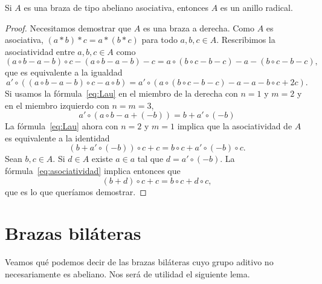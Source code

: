 


\begin{theorem}
    \label{thm:Lau}
	Si $A$ es una braza de tipo abeliano asociativa, entonces $A$ es un anillo radical. 	
\end{theorem}

\begin{proof}
    Necesitamos demostrar que $A$ es una braza a derecha. 
	Como $A$ es asociativa, $(a*b)*c=a*(b*c)$ para todo $a,b,c\in A$. Rescribimos la asociatividad entre $a,b,c\in A$ como
	\[
	(a\circ b-a-b)\circ c-(a\circ b-a-b)-c
	=a\circ (b\circ c-b-c)-a-(b\circ c-b-c),
	\]
	que es equivalente a la igualdad 
	\[
	a'\circ ( (a\circ b-a-b)\circ c-a\circ b)
	=a'\circ ( a\circ (b\circ c-b-c)-a-a-b\circ c+2c).
	\]
	Si usamos la fórmula~\eqref{eq:Lau} en el miembro 
	de la derecha con $n=1$ y $m=2$ y en el miembro izquierdo
	con $n=m=3$, 
	\[
	a'\circ (a\circ b-a+(-b))=b+a'\circ(-b)
	\]
	La fórmula~\eqref{eq:Lau} ahora con $n=2$ y $m=1$ implica que
	la asociatividad de $A$ es equivalente a la identidad 
	\begin{equation}
	    \label{eq:asociatividad}
		(b+a'\circ (-b))\circ c+c=b\circ c+a'\circ(-b)\circ c.
	\end{equation}
	Sean $b,c\in A$. Si $d\in A$ existe $a\in a$ tal que $d=a'\circ (-b)$. La fórmula~\eqref{eq:asociatividad} 
	implica entonces que
	\[
	(b+d)\circ c+c=b\circ c+d\circ c,
	\]
	que es lo que queríamos demostrar.
\end{proof}

\section{Brazas biláteras}

Veamos qué podemos decir de las brazas biláteras cuyo grupo aditivo no necesariamente es abeliano.
Nos será de utilidad el siguiente lema.

